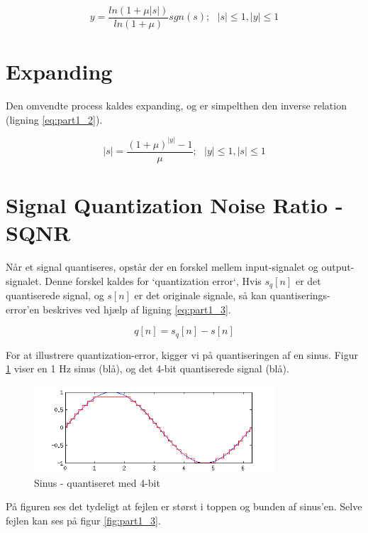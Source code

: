 \begin{equation}\label{eq:part1_1}
	y = \frac{ln(1 + \mu|s|)}{ln(1+\mu)} sgn(s); \text{   } |s| \leq 1, |y| \leq 1
\end{equation}



\section{Expanding}
Den omvendte process kaldes expanding, og er simpelthen den inverse relation (ligning \ref{eq:part1_2}).

\begin{equation}\label{eq:part1_2}
	|s| = \frac{(1 + \mu)^|y| - 1}{\mu}; \text{   } |y| \leq 1, |s| \leq 1
\end{equation}



\section{Signal Quantization Noise Ratio - SQNR}
Når et signal quantiseres, opstår der en forskel mellem input-signalet og output-signalet. Denne forskel kaldes for `quantization error`, Hvis $s_q[n]$ er det quantiserede signal, og $s[n]$ er det originale signale, så kan quantiserings-error'en beskrives ved hjælp af ligning \ref{eq:part1_3}.

\begin{equation}\label{eq:part1_3}
	q[n] = s_q[n] - s[n]
\end{equation}

For at illustrere quantization-error, kigger vi på quantiseringen af en sinus. Figur \ref{fig:part1_2} viser en 1 Hz sinus (blå), og det 4-bit quantiserede signal (blå). 

\begin{figure}[!ht]
 	\centering
 	\includegraphics[width=0.8\textwidth]{resources/part1_sine_quant}
 	\caption{Sinus - quantiseret med 4-bit}
 	\label{fig:part1_2}
\end{figure}

 På figuren ses det tydeligt at fejlen er størst i toppen og bunden af sinus'en. Selve fejlen kan ses på figur \ref{fig:part1_3}.

